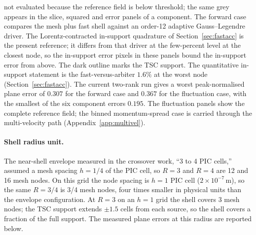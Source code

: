 not evaluated because the reference field is below threshold; the same grey
appears in the slice, squared and error panels of a component. The forward case compares the mesh
plus fast shell against an order-12 adaptive Gauss--Legendre driver. The Lorentz-contracted
in-support quadrature of Section~\ref{sec:fastacc} is the present
reference; it differs from that driver at the few-percent level at the
closest node, so the in-support error pixels in these panels bound the
in-support error from above. The dark outline marks the TSC support.
The quantitative in-support statement is the fast-versus-arbiter $1.6\%$
at the worst node (Section~\ref{sec:fastacc}).  The current two-rank run
gives a worst peak-normalised plane error of $0.307$ for the forward case and
$0.367$ for the fluctuation case, with the smallest of the six component
errors $0.195$.
The fluctuation panels show
the complete reference field; the binned momentum-spread case is carried
through the multi-velocity path (Appendix~\ref{app:multivel}).

\paragraph{Shell radius unit.}
The near-shell envelope measured in the crossover work, ``3 to 4 PIC
cells,'' assumed a mesh spacing $h=1/4$ of the PIC cell, so $R=3$ and
$R=4$ are 12 and 16 mesh nodes. On this grid the node spacing is $h=1$
PIC cell ($2\times10^{-7}$\,m), so the same $R=3/4$ is 3/4 mesh nodes, four
times smaller in physical units than the envelope configuration. At $R=3$
on an $h=1$ grid the shell covers 3 mesh nodes; the TSC support extends
$\pm1.5$ cells from each source, so the shell covers a fraction of the full
support. The measured plane errors at this radius are reported below.

